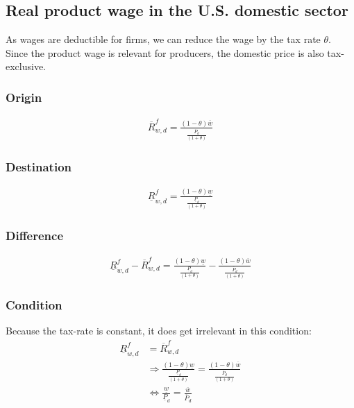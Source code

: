 \subsection*{Real product wage in the U.S. domestic sector}
As wages are deductible for firms, we can reduce the wage by the tax rate $\theta$. Since the product wage is relevant for producers, the domestic price is also tax-exclusive.
\subsubsection*{Origin}
\begin{equation}\label{prodw.o}
\begin{aligned}
\overline R^f_{w, d} = \frac{ \left( 1-\theta \right) \overline w}{\frac{\overline P_d}{ \left( 1+\theta \right) }}\end{aligned}  \end{equation}

\subsubsection*{Destination}
\begin{equation}\label{prodw.d}
\begin{aligned}
\underline R^f_{w, d} = \frac{ \left( 1-\theta \right) \underline w}{\frac{\underline P_d}{ \left( 1+\theta \right) }}\end{aligned}  \end{equation}

\subsubsection*{Difference}
\begin{equation}\label{prodw.diff}
\begin{aligned}
\underline R^f_{w, d} - \overline R^f_{w, d} = \frac{ \left( 1-\theta \right) \underline w}{\frac{\underline P_d}{ \left( 1+\theta \right) }} - \frac{ \left( 1-\theta \right) \overline w}{\frac{\overline P_d}{ \left( 1+\theta \right) }} \end{aligned}  \end{equation}

\subsubsection*{Condition}
Because the tax-rate is constant, it does get irrelevant in this condition:
\begin{equation}\label{prodw.con}
\begin{aligned}
    \underline R^f_{w, d} &= \overline R^f_{w, d} \\ &\Rightarrow \frac{ \left( 1-\theta \right) \underline w}{\frac{\underline P_d}{ \left( 1+\theta \right) }} = \frac{ \left( 1-\theta \right) \overline w}{\frac{\overline P_d}{ \left( 1+\theta \right) }} \\ &\Leftrightarrow \frac{\underline w}{\underline P_d} = \frac{\overline w}{\overline P_d} 
\end{aligned}  \end{equation}

